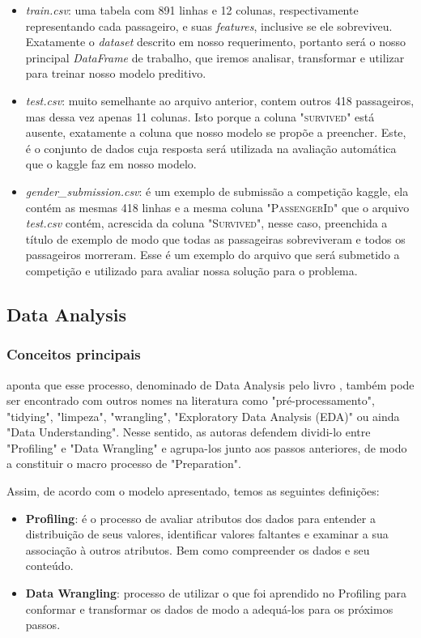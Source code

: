 \documentclass{article}
\begin{document}
\begin{itemize}
\item \emph{train.csv}:  uma tabela com 891 linhas e 12 colunas, respectivamente representando cada passageiro, e suas \emph{features}, inclusive se ele sobreviveu. Exatamente o \emph{dataset} descrito em nosso requerimento, portanto será o nosso principal \emph{DataFrame} de trabalho, que iremos analisar, transformar e utilizar para treinar nosso modelo preditivo.  
\item \emph{test.csv}: muito semelhante ao arquivo anterior, contem outros 418 passageiros, mas dessa vez apenas 11 colunas. Isto porque a coluna "\textsc{survived}" está ausente, exatamente a coluna que nosso modelo se propõe a preencher. Este, é o conjunto de dados cuja resposta será utilizada na avaliação automática que o kaggle faz em nosso modelo. 
\item \emph{gender\_submission.csv}: é um exemplo de submissão a competição kaggle, ela contém as mesmas 418 linhas e a mesma coluna "\textsc{PassengerId}" que o arquivo \emph{test.csv} contém, acrescida da coluna "\textsc{Survived}", nesse caso, preenchida a título de exemplo de modo que todas as passageiras sobreviveram e todos os passageiros morreram. Esse é um exemplo do arquivo que será submetido a competição e utilizado para avaliar nossa solução para o problema. 
\end{itemize}

\subsection{Data Analysis}
\subsubsection{Conceitos principais}
\cite{BATON} aponta que esse processo, denominado de Data Analysis pelo livro \cite{DATAPYTHON}, também pode ser encontrado com outros nomes na literatura como "pré-processamento", "tidying", "limpeza", "wrangling", "Exploratory Data Analysis (EDA)" ou ainda "Data Understanding". 
Nesse sentido, as autoras defendem dividi-lo entre "Profiling" e "Data Wrangling" e agrupa-los junto aos passos anteriores, de modo a constituir o macro processo de "Preparation". 

Assim, de acordo com o modelo apresentado, temos as seguintes definições:
\begin{itemize}
\item \textbf{Profiling}: é o processo de avaliar atributos dos dados para entender a distribuição de seus valores, identificar valores faltantes e examinar a sua associação à outros atributos. Bem como compreender os dados e seu conteúdo. 
\item \textbf{Data Wrangling}: processo de utilizar o que foi aprendido no Profiling para conformar e transformar os dados de modo a adequá-los para os próximos passos. 
\end{itemize}
\end{document}
